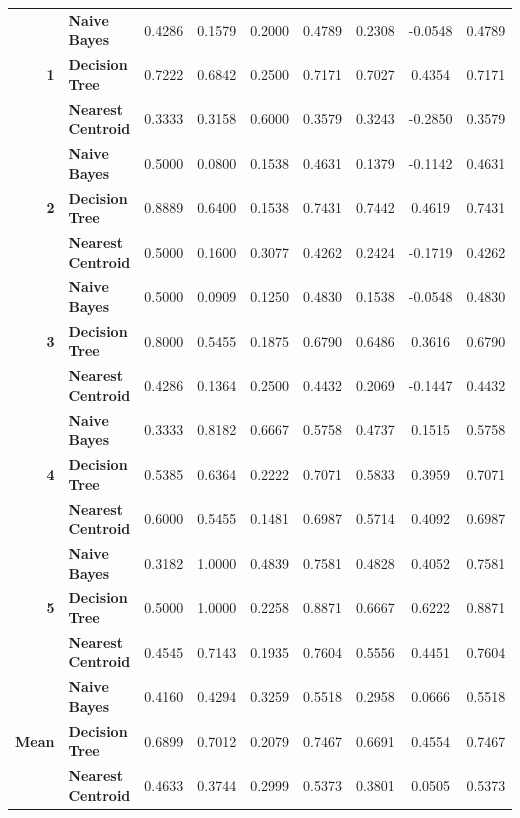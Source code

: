 \begin{center}
\begin{longtable}{ | r  l | c | c | c | c | c | c | c | }
\multirow{3}{*}{\textbf{1}} & \textbf{Naive Bayes} & 
0.4286 & 0.1579 & 0.2000 & 0.4789 & 0.2308 & -0.0548 & 0.4789 \\
& \textbf{Decision Tree} & 
0.7222 & 0.6842 & 0.2500 & 0.7171 & 0.7027 &  0.4354 & 0.7171 \\
& \textbf{Nearest Centroid} &
0.3333 & 0.3158 & 0.6000 & 0.3579 & 0.3243 & -0.2850 & 0.3579 \\
\hline
\multirow{3}{*}{\textbf{2}} & \textbf{Naive Bayes} & 
0.5000 & 0.0800 & 0.1538 & 0.4631 & 0.1379 & -0.1142 & 0.4631 \\
& \textbf{Decision Tree} & 
0.8889 & 0.6400 & 0.1538 & 0.7431 & 0.7442 &  0.4619 & 0.7431 \\
& \textbf{Nearest Centroid} &
0.5000 & 0.1600 & 0.3077 & 0.4262 & 0.2424 & -0.1719 & 0.4262 \\
\hline
\multirow{3}{*}{\textbf{3}} & \textbf{Naive Bayes} & 
0.5000 & 0.0909 & 0.1250 & 0.4830 & 0.1538 & -0.0548 & 0.4830 \\
& \textbf{Decision Tree} & 
0.8000 & 0.5455 & 0.1875 & 0.6790 & 0.6486 &  0.3616 & 0.6790 \\
& \textbf{Nearest Centroid} &
0.4286 & 0.1364 & 0.2500 & 0.4432 & 0.2069 & -0.1447 & 0.4432 \\
\hline
\multirow{3}{*}{\textbf{4}} & \textbf{Naive Bayes} & 
0.3333 & 0.8182 & 0.6667 & 0.5758 & 0.4737 &  0.1515 & 0.5758 \\
& \textbf{Decision Tree} & 
0.5385 & 0.6364 & 0.2222 & 0.7071 & 0.5833 &  0.3959 & 0.7071 \\
& \textbf{Nearest Centroid} &
0.6000 & 0.5455 & 0.1481 & 0.6987 & 0.5714 &  0.4092 & 0.6987 \\
\hline
\multirow{3}{*}{\textbf{5}} & \textbf{Naive Bayes} & 
0.3182 & 1.0000 & 0.4839 & 0.7581 & 0.4828 & 0.4052 & 0.7581 \\
& \textbf{Decision Tree} & 
0.5000 & 1.0000 & 0.2258 & 0.8871 & 0.6667 & 0.6222 & 0.8871 \\
& \textbf{Nearest Centroid} &
0.4545 & 0.7143 & 0.1935 & 0.7604 & 0.5556 & 0.4451 & 0.7604 \\
\hline
\hline
\multirow{3}{*}{\textbf{Mean}} & \textbf{Naive Bayes} & 
0.4160 & 0.4294 & 0.3259 & 0.5518 & 0.2958 & 0.0666 & 0.5518 \\
& \textbf{Decision Tree} & 
0.6899 & 0.7012 & 0.2079 & 0.7467 & 0.6691 & 0.4554 & 0.7467 \\
& \textbf{Nearest Centroid} &
0.4633 & 0.3744 & 0.2999 & 0.5373 & 0.3801 & 0.0505 & 0.5373 \\
\hline

\end{longtable}
\end{center}


